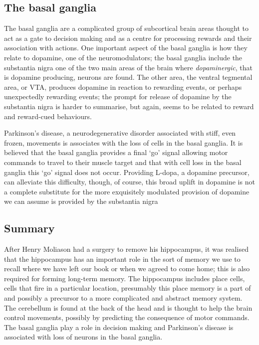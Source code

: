 \documentclass[12pt]{article}
\begin{document}
\subsection*{The basal ganglia}

The basal ganglia are a complicated group of subcortical brain areas
thought to act as a gate to decision making and as a centre for
processing rewards and their association with actions. One important
aspect of the basal ganglia is how they relate to dopamine, one of the
neuromodulators; the basal ganglia include the substantia nigra one of
the two main areas of the brain where \textsl{dopaminergic}, that is
dopamine producing, neurons are found. The other area, the ventral
tegmental area, or VTA, produces dopamine in reaction to rewarding
events, or perhaps unexpectedly rewarding events; the prompt for
release of dopamine by the substantia nigra is harder to summarise,
but again, seems to be related to reward and reward-cued behaviours.

Parkinson's disease, a neurodegenerative disorder associated with
stiff, even frozen, movements is associates with the loss of cells in
the basal ganglia. It is believed that the basal ganglia provides a
final `go' signal allowing motor commands to travel to their muscle
target and that with cell loss in the basal ganglia this `go' signal
does not occur. Providing L-dopa, a dopamine precursor, can alleviate
this difficulty, though, of course, this broad uplift in dopamine is
not a complete substitute for the more exquisitely modulated provision
of dopamine we can assume is provided by the substantia nigra

\subsection*{Summary}

After Henry Moliason had a surgery to remove his hippocampus, it was
realised that the hippocampus has an important role in the sort of
memory we use to recall where we have left our book or when we agreed
to come home; this is also required for forming long-term memory. The
hippocampus includes place cells, cells that fire in a particular
location, presumably this place memory is a part of and possibly a
precursor to a more complicated and abstract memory system. The
cerebellum is found at the back of the head and is thought to help the
brain control movements, possibly by predicting the consequence of
motor commands. The basal ganglia play a role in decision making and
Parkinson's disease is associated with loss of neurons in the basal
ganglia.
\end{document}
